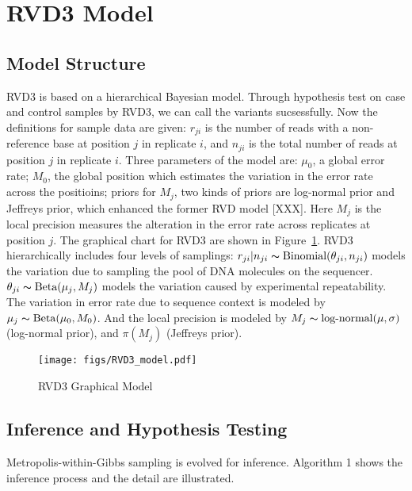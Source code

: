 \documentclass[11pt,reqno]{amsart}
\begin{document}
\section{RVD3 Model}

\subsection{Model Structure}\label{sec:model_structure}
RVD3 is based on a hierarchical Bayesian model. Through hypothesis test on case and control samples by RVD3, we can call the variants sucsessfully. Now the definitions for sample data are given: $r_{ji}$ is the number of reads with a non-reference base at position $j$ in replicate $i$, and $n_{ji}$ is the total number of reads at position $j$ in replicate $i$. Three parameters of the model are: $\mu_0$, a global error rate; $M_0$, the global position which estimates the variation in the error rate across the positioins; priors for $M_j$, two kinds of priors are log-normal prior and Jeffreys prior, which enhanced the former RVD model [XXX]. Here $M_j$ is the local precision measures the alteration in the error rate across replicates at position $j$. The graphical chart for RVD3 are shown in Figure~\ref{fig:graphical_model}.
RVD3 hierarchically includes four levels of samplings: $r_{ji} | n_{ji} \thicksim \text{Binomial}(\theta_{ji}, n_{ji})$ models the variation due to sampling the pool of DNA molecules on the sequencer. $\theta_{ji} \thicksim \text{Beta}(\mu_j, M_j)$ models the variation caused by experimental repeatability. The variation in error rate due to sequence context is modeled by $\mu_j \thicksim \text{Beta}(\mu_0, M_0)$. And the local precision is modeled by $ M_{j} \thicksim \text{log-normal}(\mu, \sigma)$ (log-normal prior), and $\pi\left({M}_{j}\right)$ (Jeffreys prior).

\begin{figure}[h]
\begin{center}
\texttt{[image: figs/RVD3\_model.pdf]}
\caption{RVD3 Graphical Model}
\label{fig:graphical_model}
\end{center}
\end{figure}


\subsection{Inference and Hypothesis Testing}
Metropolis-within-Gibbs sampling is evolved for inference. Algorithm 1 shows the inference process and the detail are illustrated.
\end{document}
